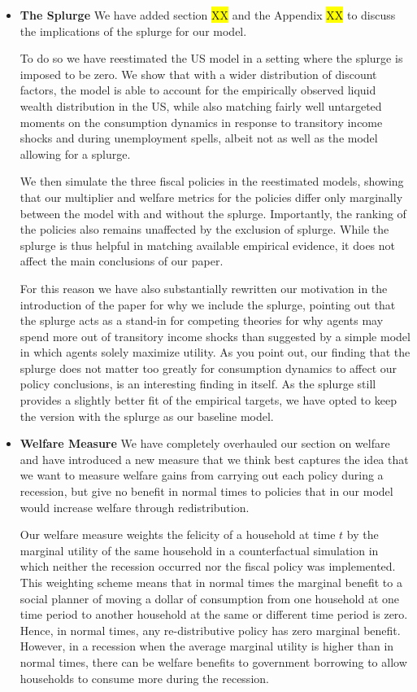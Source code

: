 \begin{itemize}
	\item \textbf{The Splurge} We have added section \colorbox{yellow}{XX} and the Appendix \colorbox{yellow}{XX} to discuss the implications of the splurge for our model. 
	
	To do so we have reestimated the US model in a setting where the splurge is imposed to be zero. We show that with a wider distribution of discount factors, the model is able to account for the empirically observed liquid wealth distribution in the US, while also matching fairly well untargeted moments on the consumption dynamics in response to transitory income shocks and during unemployment spells, albeit not as well as the model allowing for a splurge. 
	
	We then simulate the three fiscal policies in the reestimated models, showing that our multiplier and welfare metrics for the policies differ only marginally between the model with and without the splurge. Importantly, the ranking of the policies also remains unaffected by the exclusion of splurge. While the splurge is thus helpful in matching available empirical evidence, it does not affect the main conclusions of our paper.
	
	For this reason we have also substantially rewritten our motivation in the introduction of the paper for why we include the splurge, pointing out that the splurge acts as a stand-in for competing theories for why agents may spend more out of transitory income shocks than suggested by a simple model in which agents solely maximize utility. As you point out, our finding that the splurge does not matter too greatly for consumption dynamics to affect our policy conclusions, is an interesting finding in itself. As the splurge still provides a slightly better fit of the empirical targets, we have opted to keep the version with the splurge as our baseline model.
	
	
	\item \textbf{Welfare Measure} We have completely overhauled our section on welfare and have introduced a new measure that we think best captures the idea that we want to measure welfare gains from carrying out each policy during a recession, but give no benefit in normal times to policies that in our model would increase welfare through redistribution. 
	
	Our welfare measure weights the felicity of a household at time $t$ by the marginal utility of the same household in a counterfactual simulation in which neither the recession occurred nor the fiscal policy was implemented. This weighting scheme means that in normal times the marginal benefit to a social planner of moving a dollar of consumption from one household at one time period to another household at the same or different time period is zero. Hence, in normal times, any re-distributive policy has zero marginal benefit. However, in a recession when the average marginal utility is higher than in normal times, there can be welfare benefits to government borrowing to allow households to consume more during the recession.
	

\end{itemize}
